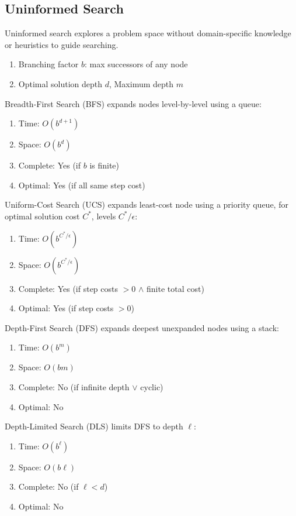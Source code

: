 \documentclass[12pt, a4paper]{article}
\begin{document}
\begin{multicols*}{3}
\subsection{Uninformed Search}
Uninformed search explores a problem space without domain-specific knowledge or heuristics to guide searching.
\begin{enumerate}[\roman*.]
  \item Branching factor $b$: max successors of any node 
  \item Optimal solution depth $d$, Maximum depth $m$ 
\end{enumerate}

Breadth-First Search (BFS) expands nodes level-by-level using a queue:
\begin{enumerate}[\roman*.]
  \item Time: $O(b^{d+1})$ 
  \item Space: $O(b^d)$
  \item Complete: Yes (if $b$ is finite)
  \item Optimal: Yes (if all same step cost)
\end{enumerate}

Uniform-Cost Search (UCS) expands least-cost node using a priority queue, for optimal solution cost $C^*$, levels $C^* /\epsilon$:
\begin{enumerate}[\roman*.]
  \item Time: $O(b^{C^*/ \epsilon})$ 
  \item Space: $O(b^{C^* /\epsilon})$
  \item Complete: Yes (if step costs $> 0$ $\land$ finite total cost)
  \item Optimal: Yes (if step costs $> 0$)
\end{enumerate}

Depth-First Search (DFS) expands deepest unexpanded nodes using a stack:
\begin{enumerate}[\roman*.]
  \item Time: $O(b^{m})$ 
  \item Space: $O(bm)$
  \item Complete: No (if infinite depth $\lor$ cyclic)
  \item Optimal: No 
\end{enumerate}

Depth-Limited Search (DLS) limits DFS to depth $\ell$:
\begin{enumerate}[\roman*.]
  \item Time: $O(b^{\ell})$
  \item Space: $O(b\ell)$
  \item Complete: No (if $\ell < d$)
  \item Optimal: No
\end{enumerate}


\end{multicols*}
\end{document}
